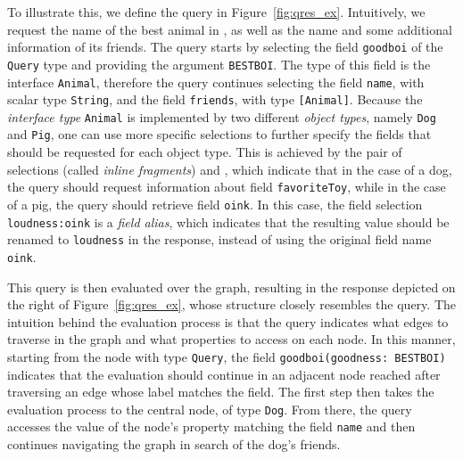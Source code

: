 To illustrate this, we define the query in
Figure~\ref{fig:qres_ex}. Intuitively, we request the name of the best
animal in \goodbois, as well as the name and some additional
information of its friends. The query starts by selecting the field
\texttt{goodboi} of the \texttt{Query} type and providing the argument
\texttt{BESTBOI}. The type of this field is the interface
\texttt{Animal}, therefore the query continues selecting the field
\texttt{name}, with scalar type \texttt{String}, and the field
\texttt{friends}, with type \texttt{[Animal]}.  Because the {\em interface
type} \texttt{Animal} is implemented by two different {\em object types},
namely \texttt{Dog} and \texttt{Pig}, one can use more specific
selections to further specify the fields that should be requested for
each object type. 
This is achieved by the pair of selections (called {\em inline fragments})
 and , which indicate that in the case of a 
dog, the query should request information about field
\texttt{favoriteToy}, while in the case of a pig, the query should
retrieve field \texttt{oink}. In this case, the field selection
\texttt{loudness:oink} is a {\em field alias}, which indicates that
the resulting value should be renamed to \texttt{loudness} in the response, instead of using the original field name \texttt{oink}.  

This query is then evaluated over the graph, resulting in the response
depicted on the right of Figure~\ref{fig:qres_ex}, whose structure closely
resembles the query.  The intuition behind the evaluation process is
that the query indicates what edges to traverse in the graph and what
properties to access on each node. In this manner, starting from the
node with type \texttt{Query}, the field \texttt{goodboi(goodness:
  BESTBOI)} indicates that the evaluation should continue in an
adjacent node reached after traversing an edge whose label matches the
field. The first step then takes the evaluation process to the central
node, of type \texttt{Dog}.  From there, the query accesses the value
of the node's property matching the field \texttt{name} and then
continues navigating the graph in search of the dog's friends.


